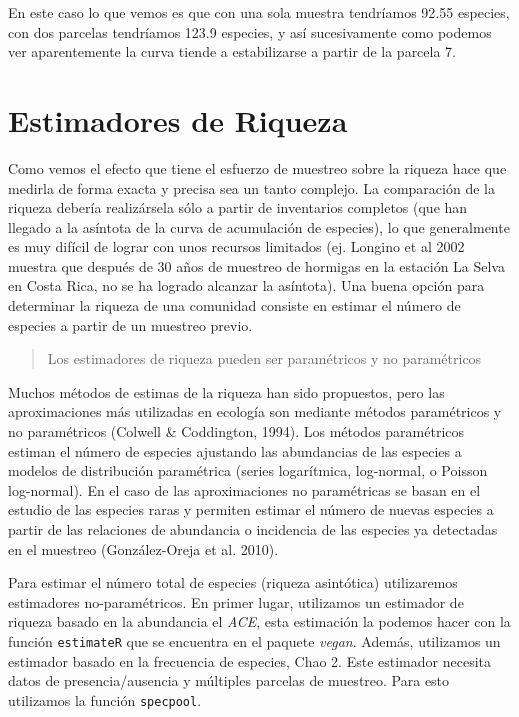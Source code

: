 \documentclass[]{book}
\begin{document}
En este caso lo que vemos es que con una sola muestra tendríamos 92.55
especies, con dos parcelas tendríamos 123.9 especies, y así
sucesivamente como podemos ver aparentemente la curva tiende a
estabilizarse a partir de la parcela 7.

\section{Estimadores de Riqueza}\label{estimadores-de-riqueza}

Como vemos el efecto que tiene el esfuerzo de muestreo sobre la riqueza
hace que medirla de forma exacta y precisa sea un tanto complejo. La
comparación de la riqueza debería realizársela sólo a partir de
inventarios completos (que han llegado a la asíntota de la curva de
acumulación de especies), lo que generalmente es muy difícil de lograr
con unos recursos limitados (ej. Longino et al 2002 muestra que después
de 30 años de muestreo de hormigas en la estación La Selva en Costa
Rica, no se ha logrado alcanzar la asíntota). Una buena opción para
determinar la riqueza de una comunidad consiste en estimar el número de
especies a partir de un muestreo previo.

\begin{quote}
Los estimadores de riqueza pueden ser paramétricos y no paramétricos
\end{quote}

Muchos métodos de estimas de la riqueza han sido propuestos, pero las
aproximaciones más utilizadas en ecología son mediante métodos
paramétricos y no paramétricos (Colwell \& Coddington, 1994). Los
métodos paramétricos estiman el número de especies ajustando las
abundancias de las especies a modelos de distribución paramétrica
(series logarítmica, log-normal, o Poisson log-normal). En el caso de
las aproximaciones no paramétricas se basan en el estudio de las
especies raras y permiten estimar el número de nuevas especies a partir
de las relaciones de abundancia o incidencia de las especies ya
detectadas en el muestreo (González-Oreja et al. 2010).

Para estimar el número total de especies (riqueza asintótica)
utilizaremos estimadores no-paramétricos. En primer lugar, utilizamos un
estimador de riqueza basado en la abundancia el \emph{ACE}, esta
estimación la podemos hacer con la función \texttt{estimateR} que se
encuentra en el paquete \emph{vegan}. Además, utilizamos un estimador
basado en la frecuencia de especies, Chao 2. Este estimador necesita
datos de presencia/ausencia y múltiples parcelas de muestreo. Para esto
utilizamos la función \texttt{specpool}.
\end{document}
